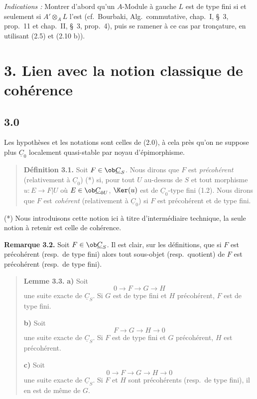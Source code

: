 \textit{Indications :} Montrer d'abord qu'un $A$-Module à gauche $L$ est de type fini si et seulement si $A' \otimes_A L$ l'est (cf.\ Bourbaki, Alg.\ commutative, chap.\ I, \S\ 3, prop.\ 11 et chap.\ II, \S\ 3, prop.\ 4), puis se ramener à ce cas par tronçature, en utilisant (2.5) et (2.10 b)).

\section*{3. Lien avec la notion classique de cohérence}

\subsection*{3.0}

Les hypothèses et les notations sont celles de (2.0), à cela près qu'on ne suppose plus $\underline{C}_0$ localement quasi-stable par noyau d'épimorphisme.

\begin{quote}
\textbf{Définition 3.1.} Soit $F \in \ob \underline{C}_S$. Nous dirons que $F$ est \emph{précohérent} (relativement à $\underline{C}_0$) (*) si, pour tout $U$ au-dessus de $S$ et tout morphisme $u : E \to F|U$ où $E \in \ob \underline{C}_{0U}$, $\Ker(u)$ est de $\underline{C}_0$-type fini (1.2). Nous dirons que $F$ est \emph{cohérent} (relativement à $\underline{C}_0$) si $F$ est précohérent et de type fini.
\end{quote}

(*) Nous introduisons cette notion ici à titre d'intermédiaire technique, la seule notion à retenir est celle de cohérence.

\textbf{Remarque 3.2.} Soit $F \in \ob \underline{C}_S$. Il est clair, sur les définitions, que si $F$ est précohérent (resp.\ de type fini) alors tout sous-objet (resp.\ quotient) de $F$ est précohérent (resp.\ de type fini).

\begin{quote}
\textbf{Lemme 3.3.}
\textbf{a)} Soit
\[
0 \longrightarrow F \longrightarrow G \longrightarrow H
\]
une suite exacte de $\underline{C}_S$. Si $G$ est de type fini et $H$ précohérent, $F$ est de type fini.

\textbf{b)} Soit
\[
F \longrightarrow G \longrightarrow H \longrightarrow 0
\]
une suite exacte de $\underline{C}_S$. Si $F$ est de type fini et $G$ précohérent, $H$ est précohérent.

\textbf{c)} Soit
\[
0 \longrightarrow F \longrightarrow G \longrightarrow H \longrightarrow 0
\]
une suite exacte de $\underline{C}_S$. Si $F$ et $H$ sont précohérents (resp.\ de type fini), il en est de même de $G$.
\end{quote}

